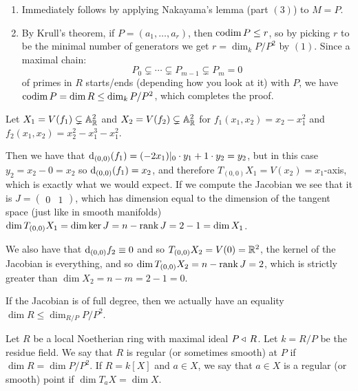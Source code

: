 \documentclass[11pt,a4paper]{article}
\newcommand{\A}{\mathbb A}
\begin{document}
\begin{proofof}{} \phantom{}
  \begin{enumerate}
  \item[(1)] Immediately follows by applying
    Nakayama's lemma (part $(3)$) to $M = P$.
  \item[(2)] By Krull's theorem, if $P = (a_1,\dots,a_r)$,
    then $\operatorname{codim} P \le r$,
    so by picking $r$ to be the minimal number of generators we get
    $r = \dim_k P/P^2$ by $(1)$.
    Since a maximal chain:
    \[
      P_0 \subsetneq \cdots \subsetneq P_{m-1} \subsetneq P_m = 0
    \]
    of primes in $R$ starts/ends (depending how you look at it) with $P$,
    we have $\operatorname{codim} P = \dim R \le \dim_k P/P^2$,
    which completes the proof.
  \end{enumerate}
\end{proofof}

\begin{example}
  Let $X_1 = V(f_1) \subsetneq \A_{\R}^2$ and 
  $X_2 = V(f_2) \subsetneq \A_{\R}^2$ for $f_1(x_1,x_2) = x_2 - x_1^2$
  and $f_2(x_1,x_2) = x_2^2 - x_1^3 - x_1^2$.

  Then we have that
  $\mathrm{d}_{(0,0)}(f_1) = (-2x_1)\vert_0 \cdot y_1 + 1 \cdot y_2 = y_2$,
  but in this case $y_2 = x_2 - 0 = x_2$ so $\mathrm{d}_{(0,0)}(f_1) = x_2$,
  and therefore $T_{(0,0)} X_1 = V(x_2) = x_1$-axis,
  which is exactly what we would expect.
  If we compute the Jacobian we see that it is
  $J = \begin{pmatrix} 0 & 1\end{pmatrix}$,
  which has dimension equal to the dimension of the tangent space
  (just like in smooth manifolds)
  $\dim T_{(0,0)} X_1 = \dim \ker J = n - \operatorname{rank} J = 2 - 1 = \dim X_1$.

  We also have that $\mathrm{d}_{(0,0)} f_{2} \equiv 0$
  and so $T_{(0,0)} X_2 = V(0) = \mathbb{R}^2$, the kernel of the Jacobian is
  everything, and so $\dim T_{(0,0)} X_2 = n - \operatorname{rank} J = 2$,
  which is strictly greater than $\dim X_2 = n - m = 2 - 1 = 0$.
\end{example}

\begin{remark}
  If the Jacobian is of full degree, then we actually have an equality
  $\dim R \le \dim_{R/P} P/P^2$.
\end{remark}

\begin{definition}
  Let $R$ be a local Noetherian ring with maximal ideal $P \triangleleft\, R$.
  Let $k = R/P$ be the residue field.
  We say that $R$ is regular (or sometimes smooth) at $P$
  if $\dim R = \dim P/P^2$.
  If $R = k[X]$ and $a \in X$, we say that $a \in X$
  is a regular (or smooth) point if $\dim T_{a} X = \dim X$.
\end{definition}
\end{document}
